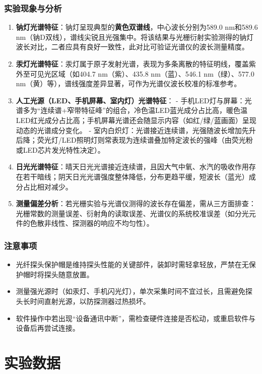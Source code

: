 \documentclass[11pt]{article}
\begin{document}
\subsubsection{实验现象与分析}
\begin{enumerate}
    \item \textbf{钠灯光谱特征}：钠灯呈现典型的\textbf{黄色双谱线}，中心波长分别为589.0 nm和589.6 nm（钠D双线），谱线尖锐且光强集中。将该结果与光栅衍射实验测得的钠灯波长对比，二者应具有良好一致性，此对比可验证光谱仪的波长测量精度。
    \item \textbf{汞灯光谱特征}：汞灯属于原子发射光谱，表现为多条离散的特征明线，覆盖紫外至可见光区域（如404.7 nm（紫）、435.8 nm（蓝）、546.1 nm（绿）、577.0 nm（黄）等），谱线强度差异显著，可作为光谱仪波长校准的标准参考。
    \item \textbf{人工光源（LED、手机屏幕、室内灯）光谱特征}：
        - 手机LED灯与屏幕：光谱多为“连续谱+窄带特征峰”的组合，冷色温LED蓝光成分占比高，暖色温LED红光成分占比高；手机屏幕光谱还会随显示内容（如红/绿/蓝画面）呈现动态的光谱成分变化。
        - 室内白炽灯：光谱接近连续谱，光强随波长增加先升后降；荧光灯/LED照明灯则常表现为连续谱叠加特定波长的强峰（由荧光粉或LED芯片发光特性决定）。
    \item \textbf{日光光谱特征}：晴天日光光谱接近连续谱，且因大气中氧、水汽的吸收作用存在若干暗线；阴天日光光谱强度整体降低，分布更趋平缓，短波长（蓝光）成分占比相对减少。
    \item \textbf{测量偏差分析}：若光栅实验与光谱仪测得的波长存在偏差，需从三方面排查：光栅常数的测量误差、衍射角的读取误差、光谱仪的系统校准误差（如分光元件的色散非线性、探测器的响应不均匀性）。
\end{enumerate}

\subsubsection{注意事项}
\begin{itemize}
    \item 光纤探头保护帽是维持探头性能的关键部件，装卸时需轻拿轻放，严禁在无保护帽时将探头随意放置。
    \item 测量强光源时（如汞灯、手机闪光灯），单次采集时间不宜过长，且需避免探头长时间直射光源，以防探测器过热损坏。
    \item 软件操作中若出现“设备通讯中断”，需检查硬件连接是否松动，或重启软件与设备后再尝试连接。
\end{itemize}
\section{实验数据}
\end{document}
